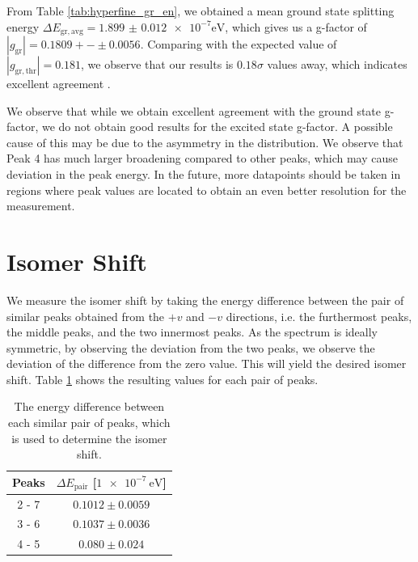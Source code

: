 \documentclass[a4paper]{report}
\numberwithin{equation}{section}
\begin{document}
From Table \ref{tab:hyperfine_gr_en}, we obtained a mean ground state splitting energy $\Delta E_{\mathrm{gr, avg}} = \num[scientific-notation=true]{1.899(12)e-7}\si{\electronvolt}$, 
which gives us a g-factor of $| g_\mathrm{gr} | = 0.1809 +-\pm 0.0056$. Comparing with the expected value of $| g_\mathrm{gr, thr} | = 0.181$, 
we observe that our results is $0.18\sigma$ values away, which indicates excellent agreement \cite{VANIN2007}.\par 

We observe that while we obtain excellent agreement with the ground state g-factor, we do not obtain good results for the excited 
state g-factor. A possible cause of this may be due to the asymmetry in the distribution. We observe that Peak 4 has much larger 
broadening compared to other peaks, which may cause deviation in the peak energy. In the future, more datapoints should be taken in 
regions where peak values are located to obtain an even better resolution for the measurement.

\section{Isomer Shift}

We measure the isomer shift by taking the energy difference between the pair of similar peaks obtained from the $+v$ and $-v$
directions, i.e. the furthermost peaks, the middle peaks, and the two innermost peaks. As the spectrum is ideally symmetric, 
by observing the deviation from the two peaks, we observe the deviation of the difference from the zero value. This will yield the 
desired isomer shift. Table \ref{tab:isomer_en} shows the resulting values for each pair of peaks. 

\begin{table}[!ht]
    \centering
    \begin{tabular}{|c|c|}
    \hline
        Peaks & $\Delta E_\mathrm{pair}$ [$\SI{1e-7}{\electronvolt}$] \\ \hline
        2 - 7 & $0.1012 \pm 0.0059$ \\ \hline
        3 - 6 & $0.1037 \pm 0.0036$ \\ \hline
        4 - 5 & $0.080 \pm 0.024$ \\ \hline
    \end{tabular}
    \caption{The energy difference between each similar pair of peaks, which is used to determine the isomer shift.}
    \label{tab:isomer_en}
\end{table}
\end{document}
